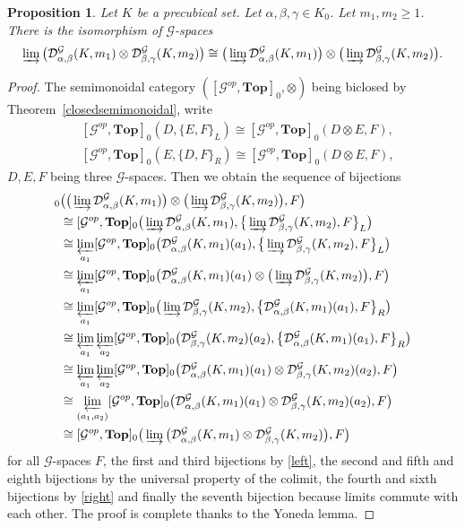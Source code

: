 \documentclass[a4paper,12pt]{amsart}
\newcommand{\D}{\mathcal{D}}
\newtheorem{prop}[thm]{Proposition}
\newcommand{\bp}{\begin{prop}}
\newcommand{\ep}{\end{prop}}
\newcommand{\bpf}{\begin{proof}}
\newcommand{\epf}{\end{proof}}
\theoremstyle{definition}
\renewcommand{\top}{{\mathbf{Top}}}
\newcommand{\iso}{\cong}
\newcommand{\ot}{\otimes}
\renewcommand{\geq}{\geqslant}
\newcommand{\topdgr}{[\mathcal{G}^{op},\top]}
\newcommand{\liminj}{\varinjlim}
\newcommand{\limproj}{\varprojlim}
\begin{document}
\bp \label{cassepied}
Let $K$ be a precubical set. Let $\alpha,\beta,\gamma\in K_0$. Let $m_1,m_2\geq 1$. There is the isomorphism of $\mathcal{G}$-spaces 
\[
\liminj \big(\D_{\alpha,\beta}^{\mathcal{G}}(K,m_1)\ot \D_{\beta,\gamma}^{\mathcal{G}}(K,m_2)\big) \iso \big(\liminj\D_{\alpha,\beta}^{\mathcal{G}}(K,m_1)\big)\ot \big(\liminj\D_{\beta,\gamma}^{\mathcal{G}}(K,m_2)\big).
\]
\ep


\bpf
The semimonoidal category $(\topdgr_0,\ot)$ being biclosed by Theorem~\ref{closedsemimonoidal}, write
\begin{align}
	&\topdgr_0(D,\{E,F\}_L) \iso \topdgr_0(D\ot E,F), \label{left} \tag{L}\\
	&\topdgr_0(E,\{D,F\}_R) \iso \topdgr_0(D\ot E,F), \label{right} \tag{R}
\end{align}
$D,E,F$ being three $\mathcal{G}$-spaces. Then we obtain the sequence of bijections
\begin{align*}
	\topdgr_0&\big(\big(\liminj\D_{\alpha,\beta}^{\mathcal{G}}(K,m_1)\big)\ot \big(\liminj\D_{\beta,\gamma}^{\mathcal{G}}(K,m_2)\big),F\big) \\
	&\iso \topdgr_0\big(\liminj\D_{\alpha,\beta}^{\mathcal{G}}(K,m_1),\big\{\liminj \D_{\beta,\gamma}^{\mathcal{G}}(K,m_2),F\big\}_L\big)\\
	&\iso \limproj_{a_1} \topdgr_0\big(\D_{\alpha,\beta}^{\mathcal{G}}(K,m_1)(a_1),\big\{\liminj \D_{\beta,\gamma}^{\mathcal{G}}(K,m_2),F\big\}_L\big)\\
	&\iso \limproj_{a_1} \topdgr_0\big(\D_{\alpha,\beta}^{\mathcal{G}}(K,m_1)(a_1)\ot \big(\liminj\D_{\beta,\gamma}^{\mathcal{G}}(K,m_2)\big),F\big)\\
	&\iso \limproj_{a_1} \topdgr_0\big(\liminj \D_{\beta,\gamma}^{\mathcal{G}}(K,m_2),\big\{\D_{\alpha,\beta}^{\mathcal{G}}(K,m_1)(a_1),F\big\}_R\big) \\
	&\iso \limproj_{a_1} \limproj_{a_2} \topdgr_0\big( \D_{\beta,\gamma}^{\mathcal{G}}(K,m_2)(a_2),\big\{\D_{\alpha,\beta}^{\mathcal{G}}(K,m_1)(a_1),F\big\}_R\big) \\
	&\iso \limproj_{a_1} \limproj_{a_2} \topdgr_0\big(\D_{\alpha,\beta}^{\mathcal{G}}(K,m_1)(a_1)\ot \D_{\beta,\gamma}^{\mathcal{G}}(K,m_2)(a_2),F\big)\\
	&\iso \limproj_{(a_1,a_2)} \topdgr_0\big(\D_{\alpha,\beta}^{\mathcal{G}}(K,m_1)(a_1)\ot \D_{\beta,\gamma}^{\mathcal{G}}(K,m_2)(a_2),F\big)\\
	&\iso \topdgr_0\big(\liminj \big(\D_{\alpha,\beta}^{\mathcal{G}}(K,m_1)\ot \D_{\beta,\gamma}^{\mathcal{G}}(K,m_2)\big),F\big)
\end{align*}
for all $\mathcal{G}$-spaces $F$, the first and third bijections by \eqref{left}, the second and fifth and eighth bijections by the universal property of the colimit, the fourth and sixth bijections by \eqref{right} and finally the seventh bijection because limits commute with each other. The proof is complete thanks to the Yoneda lemma. 
\epf
\end{document}
